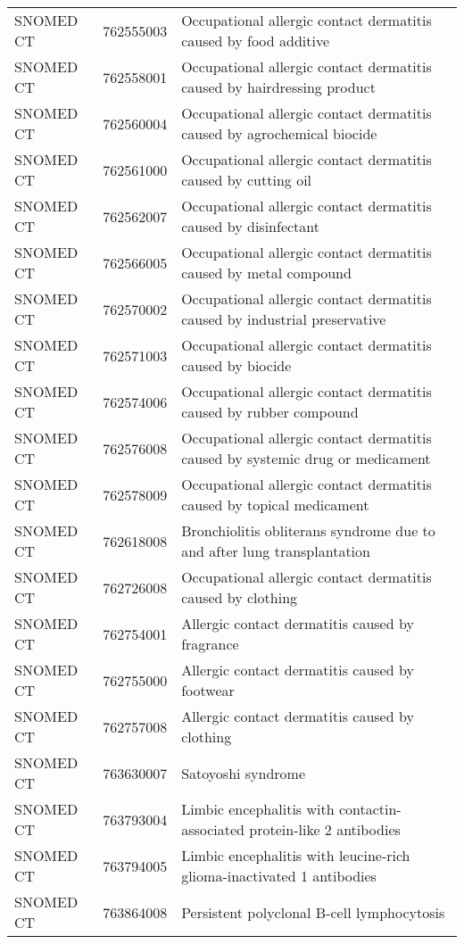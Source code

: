 \begin{longtable}{p{}p{}p{}}
  SNOMED CT & 762555003 & Occupational allergic contact dermatitis caused by food additive \\ 
  SNOMED CT & 762558001 & Occupational allergic contact dermatitis caused by hairdressing product \\ 
  SNOMED CT & 762560004 & Occupational allergic contact dermatitis caused by agrochemical biocide \\ 
  SNOMED CT & 762561000 & Occupational allergic contact dermatitis caused by cutting oil \\ 
  SNOMED CT & 762562007 & Occupational allergic contact dermatitis caused by disinfectant \\ 
  SNOMED CT & 762566005 & Occupational allergic contact dermatitis caused by metal compound \\ 
  SNOMED CT & 762570002 & Occupational allergic contact dermatitis caused by industrial preservative \\ 
  SNOMED CT & 762571003 & Occupational allergic contact dermatitis caused by biocide \\ 
  SNOMED CT & 762574006 & Occupational allergic contact dermatitis caused by rubber compound \\ 
  SNOMED CT & 762576008 & Occupational allergic contact dermatitis caused by systemic drug or medicament \\ 
  SNOMED CT & 762578009 & Occupational allergic contact dermatitis caused by topical medicament \\ 
  SNOMED CT & 762618008 & Bronchiolitis obliterans syndrome due to and after lung transplantation \\ 
  SNOMED CT & 762726008 & Occupational allergic contact dermatitis caused by clothing \\ 
  SNOMED CT & 762754001 & Allergic contact dermatitis caused by fragrance \\ 
  SNOMED CT & 762755000 & Allergic contact dermatitis caused by footwear \\ 
  SNOMED CT & 762757008 & Allergic contact dermatitis caused by clothing \\ 
  SNOMED CT & 763630007 & Satoyoshi syndrome \\ 
  SNOMED CT & 763793004 & Limbic encephalitis with contactin-associated protein-like 2 antibodies \\ 
  SNOMED CT & 763794005 & Limbic encephalitis with leucine-rich glioma-inactivated 1 antibodies \\ 
  SNOMED CT & 763864008 & Persistent polyclonal B-cell lymphocytosis \\ 

\end{longtable}
